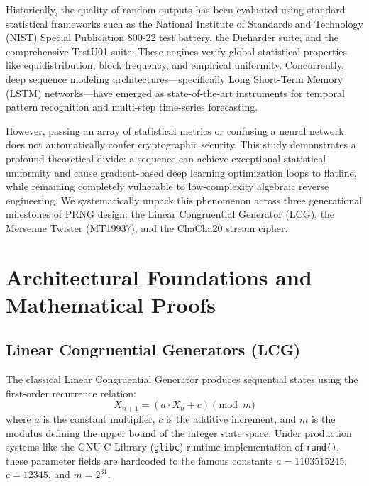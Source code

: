 \documentclass[twocolumn,10pt]{article}
\begin{document}
Historically, the quality of random outputs has been evaluated using standard statistical frameworks such as the National Institute of Standards and Technology (NIST) Special Publication 800-22 test battery, the Dieharder suite, and the comprehensive TestU01 suite. These engines verify global statistical properties like equidistribution, block frequency, and empirical uniformity. Concurrently, deep sequence modeling architectures---specifically Long Short-Term Memory (LSTM) networks---have emerged as state-of-the-art instruments for temporal pattern recognition and multi-step time-series forecasting. 

However, passing an array of statistical metrics or confusing a neural network does not automatically confer cryptographic security. This study demonstrates a profound theoretical divide: a sequence can achieve exceptional statistical uniformity and cause gradient-based deep learning optimization loops to flatline, while remaining completely vulnerable to low-complexity algebraic reverse engineering. We systematically unpack this phenomenon across three generational milestones of PRNG design: the Linear Congruential Generator (LCG), the Mersenne Twister (MT19937), and the ChaCha20 stream cipher.

\section{Architectural Foundations and Mathematical Proofs}

\subsection{Linear Congruential Generators (LCG)}
The classical Linear Congruential Generator produces sequential states using the first-order recurrence relation:
\begin{equation}\label{eq:lcg_base}
X_{n+1} = (a \cdot X_n + c) \pmod m
\end{equation}
where $a$ is the constant multiplier, $c$ is the additive increment, and $m$ is the modulus defining the upper bound of the integer state space. Under production systems like the GNU C Library (\texttt{glibc}) runtime implementation of \texttt{rand()}, these parameter fields are hardcoded to the famous constants $a = 1103515245$, $c = 12345$, and $m = 2^{31}$.
\end{document}
